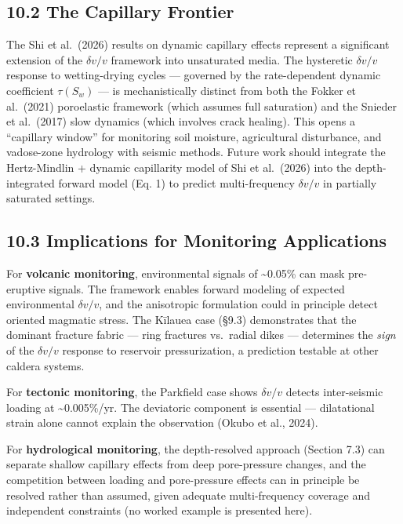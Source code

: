 \documentclass[draft]{agujournal2019}
\begin{document}
\subsection{10.2 The Capillary Frontier}\label{the-capillary-frontier}

The Shi et al.~(2026) results on dynamic capillary effects represent a
significant extension of the \(\delta v/v\) framework into unsaturated
media. The hysteretic \(\delta v/v\) response to wetting-drying cycles
--- governed by the rate-dependent dynamic coefficient \(\tau(S_w)\) ---
is mechanistically distinct from both the Fokker et al.~(2021)
poroelastic framework (which assumes full saturation) and the Snieder et
al.~(2017) slow dynamics (which involves crack healing). This opens a
``capillary window'' for monitoring soil moisture, agricultural
disturbance, and vadose-zone hydrology with seismic methods. Future work
should integrate the Hertz-Mindlin + dynamic capillarity model of Shi et
al.~(2026) into the depth-integrated forward model (Eq. 1) to predict
multi-frequency \(\delta v/v\) in partially saturated settings.

\subsection{10.3 Implications for Monitoring
Applications}\label{implications-for-monitoring-applications}

For \textbf{volcanic monitoring}, environmental signals of
\textasciitilde{}0.05\% can mask pre-eruptive signals. The framework
enables forward modeling of expected environmental \(\delta v/v\), and
the anisotropic formulation could in principle detect oriented magmatic
stress. The Kīlauea case (§9.3) demonstrates that the dominant fracture
fabric --- ring fractures vs.~radial dikes --- determines the
\emph{sign} of the \(\delta v/v\) response to reservoir pressurization,
a prediction testable at other caldera systems.

For \textbf{tectonic monitoring}, the Parkfield case shows
\(\delta v/v\) detects inter-seismic loading at
\textasciitilde{}0.005\%/yr. The deviatoric component is essential ---
dilatational strain alone cannot explain the observation (Okubo et al.,
2024).

For \textbf{hydrological monitoring}, the depth-resolved approach
(Section 7.3) can separate shallow capillary effects from deep
pore-pressure changes, and the competition between loading and
pore-pressure effects can in principle be resolved rather than assumed,
given adequate multi-frequency coverage and independent constraints (no
worked example is presented here).
\end{document}
